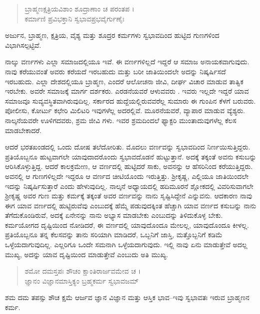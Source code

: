\begin{verse}
ಬ್ರಾಹ್ಮಣಕ್ಷತ್ರಿಯವಿಶಾಂ ಶೂದ್ರಾಣಾಂ ಚ ಪರಂತಪ ।\\ಕರ್ಮಾಣಿ ಪ್ರವಿಭಕ್ತಾನಿ ಸ್ವಭಾವಪ್ರಭವೈರ್ಗುಣೈಃ 
\end{verse}

{\small ಅರ್ಜುನ, ಬ್ರಾಹ್ಮಣ, ಕ್ಷತ್ರಿಯ, ವೈಶ್ಯ ಮತ್ತು ಶೂದ್ರರ ಕರ್ಮಗಳು ಸ್ವಭಾವದಿಂದ ಹುಟ್ಟಿದ ಗುಣಗಳಿಂದ ವಿಭಾಗಿಸಲ್ಪಟ್ಟಿವೆ.}

ನಾಲ್ಕು ವರ್ಣಗಳು ಎಲ್ಲಾ ಸಮಾಜದಲ್ಲಿಯೂ ಇವೆ. ಈ ವರ್ಣಗಳಿಲ್ಲದೆ ಇದ್ದರೆ ಆ ಸಮಾಜ ಅನಾಯಕವಾಗುವುದು. ನಾವು ಕರೆಯುವಂತೆ ಅವರು ಕರೆಯದೆ ಇರಬಹುದು ಮತ್ತು ಬರೀ ಜಾತಿಯಿಂದಲೇ ಅದನ್ನು ನಿಷ್ಕರ್ಷಿಸದೆ ಇರಬಹುದು. ಎಲ್ಲಾ ದೇಶದಲ್ಲಿಯೂ ಬ್ರಾಹ್ಮಣ, ಎಂದರೆ ಆಲೋಚನಾ ಜೀವಿ, ದೀರ್ಘ ವಿಚಾರ ಮಾಡುವ ತಾತ್ವಿಕ ಇರಬೇಕು. ಅವರೇ ಸಮಾಜಕ್ಕೆ ಮಾರ್ಗ ದರ್ಶಕರು. ಎರಡನೆಯವರೆ ಆಳುವವರು . ಇವರು ಇಲ್ಲದೇ ಇದ್ದರೆ ಯಾವ ಸಮಾಜವೂ ಸುವ್ಯವಸ್ಥಿತವಾಗಿರುವುದಿಲ್ಲ. ಸರ್ಕಾರದ ಹುದ್ದೆಯಲ್ಲಿರುವವರೆಲ್ಲ ಸುಮಾರು ಈ ಗುಂಪಿನ ಕೆಳಗೆ ಬರುವರು. ಪೋಲೀಸು, ಕೋರ್ಟು ಕಛೇರಿ ಮಿಲಿಟರಿ ಇವುಗಳೆಲ್ಲ ಅದರಲ್ಲಿವೆ. ಮೂರನೆಯವರೆ, ವ್ಯಾಪಾರ ಮಾಡುವ ವ್ಯೆಶ್ಯರು. ನಾಲ್ಕನೆಯವರೇ ಊಳಿಗದವರು, ಶ್ರಮ ಜೀವಿ ಗಳು. ಇವರ ಶ್ರಮದಿಂದಲೆ ಫ್ಯಾಕ್ಟರಿ ಮುಂತಾದುವುಗಳೆಲ್ಲ ಕೆಲಸ ಮಾಡಬೇಕಾದರೆ.

ಆದರೆ ಭರತಖಂಡದಲ್ಲಿ ಒಂದು ದೋಷ ತಲೆದೋರಿತು. ಮೊದಲು ವರ್ಣವನ್ನು ಸ್ವಭಾವದಿಂದ ನಿರ್ಣಯಿಸುತ್ತಿದ್ದರು. ಪ್ರತಿಯೊಬ್ಬನೂ ಹುಟ್ಟವಾಗಲೇ ಯಾವುದಾದರೊಂದು ಸ್ವಭಾವದೊಡನೆ ಹುಟ್ಟುತ್ತಾನೆ. ಅದಕ್ಕೆ ತಕ್ಕಂತೆ ಅವನು ಕಸುಬನ್ನು ಆರಿಸಿಕೊಳ್ಳುತ್ತಿದ್ದ. ಆದರೆ ಕಾಲಕ್ರಮೇಣ, ಆ ವರ್ಣದಲ್ಲಿ ಹುಟ್ಟಿದರೆ ಸಾಕು, ಅವನನ್ನು ಆ ಹೆಸರಿನಿಂದ ಕರೆಯುತ್ತಿದ್ದರು. ಅವನಲ್ಲಿ ಆ ಗುಣಗಳಿಲ್ಲದೇ ಇದ್ದರೂ ಆ ವರ್ಣದ ಚೀಟಿಯೊಂದು ಇರುತ್ತಿತ್ತು. ಶ್ರೀಕೃಷ್ಣ, ಎಲ್ಲಿಯೂ ಜಾತಿಯಿಂದಲೇ ಇದನ್ನು ನಿಷ್ಕರ್ಷಿಸುತ್ತಾರೆ ಎಂದು ಹೇಳುವುದಿಲ್ಲ. ನಾಲ್ಕನೆ ಅಧ್ಯಾಯದಲ್ಲಿ ಹದಿಮೂರನೆ ಶ್ಲೋಕದಲ್ಲಿ ವಿವರಿಸುವಾಗಲೇ ಶ್ರೀಕೃಷ್ಣ ಅವರ ಗುಣ ಮತ್ತು ಕರ್ಮಕ್ಕೆ ತಕ್ಕಂತೆ ಅವರ ವರ್ಣವನ್ನು ನಾನು ಸೃಷ್ಟಿಸಿದ್ದೇನೆ ಎನ್ನುವನು. ಆದಕಾರಣ ನಾವು ಈಗ ಯಾವ ವರ್ಣದಲ್ಲಿ ಹುಟ್ಟಿರುವೆವು ಎಂಬುದಕ್ಕೆ ಹೆಮ್ಮೆ ಪಡುವುದಕ್ಕಿಂತ ಹೆಚ್ಚಾಗಿ ಯಾವ ವರ್ಣದ ಕಸುಬನ್ನು ನಾನು ತೆಗೆದುಕೊಂಡಿರುವೆ, ಅದಕ್ಕೆ ಏನೇನನ್ನು ನಾನು ಅಭ್ಯಾಸ ಮಾಡಬೇಕು ಎಂಬುದನ್ನು ತಿಳಿದುಕೊಳ್ಳ ಬೇಕು. ಕರ್ಮಯೋಗದ ದೃಷ್ಟಿಯಿಂದ ನೋಡಿದರೆ, ಈ ವರ್ಣದಲ್ಲಿ ಯಾವುದೊಂದೂ ಮೇಲಲ್ಲ, ಯಾವುದೊಂದೂ ಕೀಳಲ್ಲ. ಪ್ರತಿಯೊಬ್ಬನೂ ತನ್ನ ಕೆಲಸವನ್ನು ತಾನು ಸರಿಯಾಗಿ ಮಾಡಿದರೆ, ಒಬ್ಬನಿಗೆ ಜಾಸ್ತಿ, ಮತ್ತೊಬ್ಬನಿಗೆ ಕಡಿಮೆ ಒಳ್ಳೆಯದಾಗುವುದಿಲ್ಲ. ಎಲ್ಲರಿಗೂ ಒಂದೇ ಸಮನಾಗಿ ಒಳ್ಳೆಯದಾಗುವುದು. ಇಲ್ಲಿ ನಾವು ಏನು ಮಾಡುತ್ತೇವೆ ಅದಲ್ಲ ಮುಖ್ಯ, ಅದನ್ನು ಯಾವ ದೃಷ್ಟಿಯಿಂದ ಮಾಡುತ್ತೇವೆ ಎಂಬುದು ಅತಿ ಮುಖ್ಯ.

\begin{verse}
ಶಮೋ ದಮಸ್ತಪಃ ಶೌಚಂ ಕ್ಷಾಂತಿರಾರ್ಜವಮೇವ ಚ ।\\ಜ್ಞಾನಂ ವಿಜ್ಞಾನಮಾಸ್ತಿಕ್ಯಂ ಬ್ರಹ್ಮಕರ್ಮ ಸ್ವಭಾವಜಮ್ 
\end{verse}

{\small ಶಮ ದಮ ತಪಸ್ಸು ಶೌಚ ಕ್ಷಮೆ ಆರ್ಜವ ಜ್ಞಾನ ವಿಜ್ಞಾನ ಮತ್ತು ಆಸ್ತಿಕ ಭಾವ--ಇವು ಸ್ವಭಾವತಃ ಇರುವ ಬ್ರಾಹ್ಮಣನ ಕರ್ಮ.}

